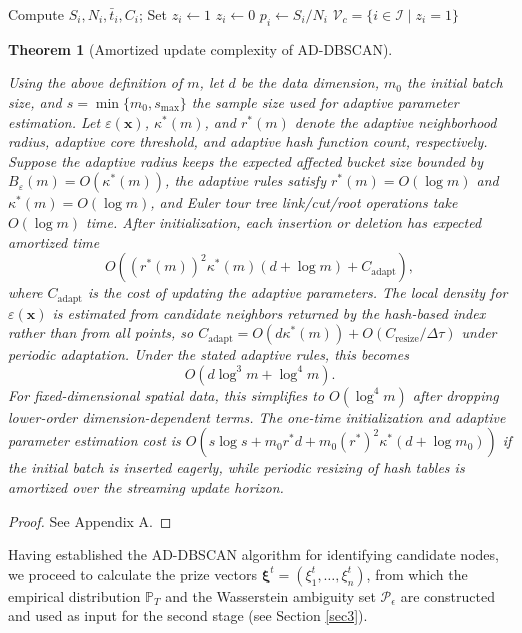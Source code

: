 \documentclass[preprint,12pt,authoryear]{elsarticle}
\newtheorem{theorem}{Theorem}
\theoremstyle{definition}
\begin{document}
\begin{algorithm}[htbp]
\begin{algorithmic}[1]
    \State Compute $S_i, N_i, \bar{t}_i, C_i$; Set $z_i \leftarrow 1$
        \State $z_i \leftarrow 0$
    \EndIf
        \State $p_i \leftarrow S_i / N_i$
    \EndIf
\EndFor
\State \Return $\mathcal{V}_c = \{i \in \mathcal{I} \mid z_i = 1\}$
\end{algorithmic}
\end{algorithm}

\begin{theorem}[Amortized update complexity of AD-DBSCAN]\label{theorem2}

Using the above definition of $m$, let $d$ be the data dimension, $m_0$ the initial batch size, and $s=\min\{m_0,s_{\max}\}$ the sample size used for adaptive parameter estimation. Let $\varepsilon(\bm{x})$, $\kappa^*(m)$, and $r^*(m)$ denote the adaptive neighborhood radius, adaptive core threshold, and adaptive hash function count, respectively. Suppose the adaptive radius keeps the expected affected bucket size bounded by $B_{\varepsilon}(m)=O(\kappa^*(m))$, the adaptive rules satisfy $r^*(m)=O(\log m)$ and $\kappa^*(m)=O(\log m)$, and Euler tour tree link/cut/root operations take $O(\log m)$ time. After initialization, each insertion or deletion has expected amortized time
\[
O\!\left((r^*(m))^2\kappa^*(m)(d+\log m)+C_{\mathrm{adapt}}\right),
\]
where $C_{\mathrm{adapt}}$ is the cost of updating the adaptive parameters. The local density for $\varepsilon(\bm{x})$ is estimated from candidate neighbors returned by the hash-based index rather than from all points, so $C_{\mathrm{adapt}}=O(d\kappa^*(m))+O(C_{\mathrm{resize}}/\Delta\tau)$ under periodic adaptation. Under the stated adaptive rules, this becomes
\[
O(d\log^3 m+\log^4 m).
\]
For fixed-dimensional spatial data, this simplifies to $O(\log^4 m)$ after dropping lower-order dimension-dependent terms. The one-time initialization and adaptive parameter estimation cost is $O(s\log s+m_0 r^* d+m_0(r^*)^2\kappa^*(d+\log m_0))$ if the initial batch is inserted eagerly, while periodic resizing of hash tables is amortized over the streaming update horizon.


\end{theorem}
\begin{proof}
See Appendix A.
\end{proof}


Having established the AD-DBSCAN algorithm for identifying candidate nodes, we proceed to calculate the prize vectors $\boldsymbol{\xi}^t = (\xi_1^t, \dots, \xi_n^t)$, from which the empirical distribution $\mathbb{P}_T$ and the Wasserstein ambiguity set $\mathcal{P}_\epsilon$ are constructed and used as input for the second stage (see Section \ref{sec3}). 
\end{document}
